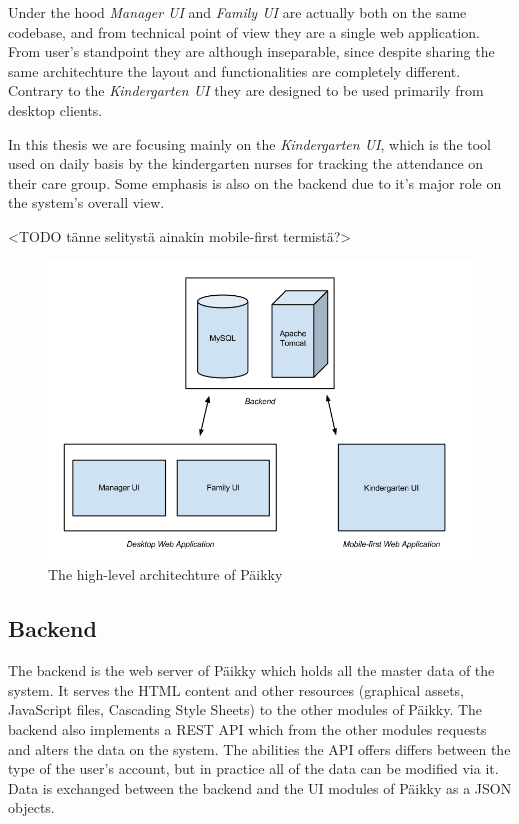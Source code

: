 Under the hood \textit{Manager UI} and \textit{Family UI} are actually both on the same codebase, and from technical point of view they are a single web application. From user's standpoint they are although inseparable, since despite sharing the same architechture the layout and functionalities are completely different. Contrary to the \textit{Kindergarten UI} they are designed to be used primarily from desktop clients. 

In this thesis we are focusing mainly on the \textit{Kindergarten UI}, which is the tool used on daily basis by the kindergarten nurses for tracking the attendance on their care group. Some emphasis is also on the backend due to it's major role on the system's overall view.

<TODO tänne selitystä ainakin mobile-first termistä?>

\begin{figure}[t]
\begin{center}
\includegraphics[width=1\textwidth]{assets/architecture.png}
\end{center}
\caption{The high-level architechture of Päikky}
\label{fig:architecture}
\end{figure}



\subsection{Backend}

The backend is the web server of Päikky which holds all the master data of the system. It serves the HTML content and other resources (graphical assets, JavaScript files, Cascading Style Sheets) to the other modules of Päikky. The backend also implements a REST API which from the other modules requests and alters the data on the system. The abilities the API offers differs between the type of the user's account, but in practice all of the data can be modified via it. Data is exchanged between the backend and the UI modules of Päikky as a JSON objects.

